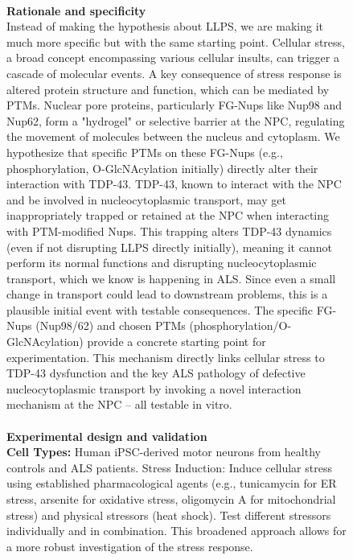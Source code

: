 \begin{figure}[htbp!]
\begin{tcolorbox}[
    colback=black!5!white,
    colframe=black!60!white,
    title=\textbf{Example output of the Generation agent},
    fonttitle=\bfseries,
    arc=3mm,
    boxrule=1pt,
    bottomrule=2pt,
]
\\
\textbf{Rationale and specificity}
\\
Instead of making the hypothesis about LLPS, we are making it much more specific but with the same starting point. Cellular stress, a broad concept encompassing various cellular insults, can trigger a cascade of molecular events. A key consequence of stress response is altered protein structure and function, which can be mediated by PTMs. Nuclear pore proteins, particularly FG-Nups like Nup98 and Nup62, form a "hydrogel" or selective barrier at the NPC, regulating the movement of molecules between the nucleus and cytoplasm. We hypothesize that specific PTMs on these FG-Nups (e.g., phosphorylation, O-GlcNAcylation initially) directly alter their interaction with TDP-43. TDP-43, known to interact with the NPC and be involved in nucleocytoplasmic transport, may get inappropriately trapped or retained at the NPC when interacting with PTM-modified Nups. This trapping alters TDP-43 dynamics (even if not disrupting LLPS directly initially), meaning it cannot perform its normal functions and disrupting nucleocytoplasmic transport, which we know is happening in ALS. Since even a small change in transport could lead to downstream problems, this is a plausible initial event with testable consequences. The specific FG-Nups (Nup98/62) and chosen PTMs (phosphorylation/O-GlcNAcylation) provide a concrete starting point for experimentation. This mechanism directly links cellular stress to TDP-43 dysfunction and the key ALS pathology of defective nucleocytoplasmic transport by invoking a novel interaction mechanism at the NPC – all testable in vitro.
\\
\\
\textbf{Experimental design and validation}
\\
\textbf{Cell Types:} Human iPSC-derived motor neurons from healthy controls and ALS patients.
Stress Induction: Induce cellular stress using established pharmacological agents (e.g., tunicamycin for ER stress, arsenite for oxidative stress, oligomycin A for mitochondrial stress) and physical stressors (heat shock). Test different stressors individually and in combination. This broadened approach allows for a more robust investigation of the stress response.


\end{tcolorbox}
\end{figure}
